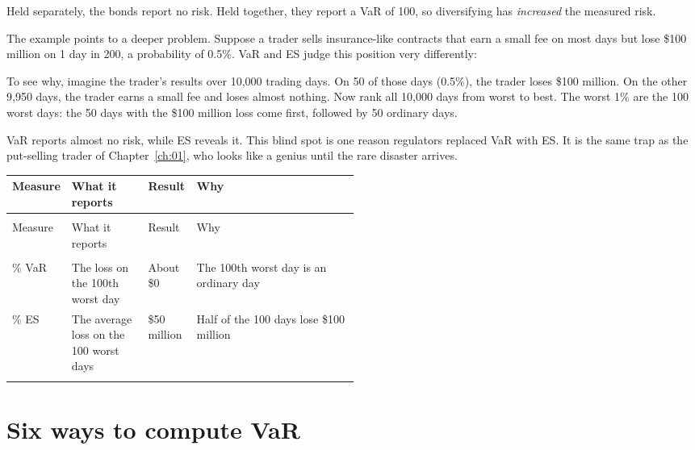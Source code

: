 Held separately, the bonds report no risk. Held together, they report a VaR of 100, so diversifying has \emph{increased} the measured risk.

The example points to a deeper problem. Suppose a trader sells insurance-like contracts that earn a small fee on most days but lose \$100 million on 1 day in 200, a probability of 0.5\%. VaR and ES judge this position very differently:

To see why, imagine the trader's results over 10,000 trading days. On 50 of those days (0.5\%), the trader loses \$100 million. On the other 9,950 days, the trader earns a small fee and loses almost nothing. Now rank all 10,000 days from worst to best. The worst 1\% are the 100 worst days: the 50 days with the \$100 million loss come first, followed by 50 ordinary days.


VaR reports almost no risk, while ES reveals it. This blind spot is one reason regulators replaced VaR with ES. It is the same trap as the put-selling trader of Chapter~\ref{ch:01}, who looks like a genius until the rare disaster arrives.

\begingroup
\small
\setlength{\LTpre}{6pt}\setlength{\LTpost}{6pt}
\begin{longtable}{@{}>{\raggedright\arraybackslash}p{0.14\linewidth}>{\raggedright\arraybackslash}p{0.22\linewidth}>{\raggedright\arraybackslash}p{0.14\linewidth}>{\raggedright\arraybackslash}p{}@{}}
\toprule
Measure & What it reports & Result & Why \\
\midrule
\endfirsthead
\multicolumn{4}{@{}l}{\emph{(continued)}} \\
\toprule
Measure & What it reports & Result & Why \\
\midrule
\endhead
\midrule
\multicolumn{4}{r@{}}{\emph{(continued on the next page)}} \\
\endfoot
\bottomrule
\endlastfoot
99\% VaR & The loss on the 100th worst day & About \$0 & The 100th worst day is an ordinary day \\*
99\% ES & The average loss on the 100 worst days & \$50 million & Half of the 100 days lose \$100 million \\*
\end{longtable}
\addtocounter{table}{-1}%
\endgroup


\section{Six ways to compute VaR}
\label{sec:11-how}


